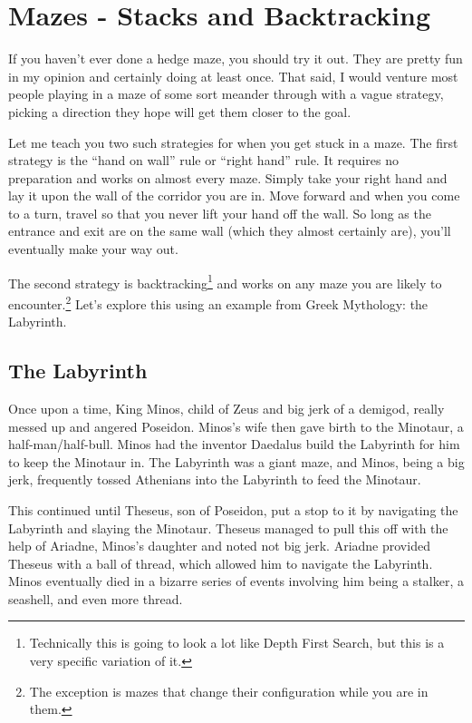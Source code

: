 \section{Mazes - Stacks and Backtracking}
\label{sec:mazes}
If you haven't ever done a hedge maze, you should try it out.  They are pretty fun in my opinion and certainly doing at least once.  That said, I would venture most people playing in a maze of some sort meander through with a vague strategy, picking a direction they hope will get them closer to the goal.

Let me teach you two such strategies for when you get stuck in a maze.  The first strategy is the ``hand on wall'' rule or ``right hand'' rule.  It requires no preparation and works on almost every maze.  Simply take your right hand and lay it upon the wall of the corridor you are in.  Move forward and when you come to a turn, travel so that you never lift your hand off the wall.  So long as the entrance and exit are on the same wall (which they almost certainly are), you'll eventually make your way out.

The second strategy is backtracking\footnote{Technically this is going to look a lot like Depth First Search, but this is a very specific variation of it.} and works on any maze you are likely to encounter.\footnote{The exception is mazes that change their configuration while you are in them.}  Let's explore this using an example from Greek Mythology: the Labyrinth. 

\subsection{The Labyrinth}
Once upon a time, King Minos, child of Zeus and big jerk of a demigod, really messed up and angered Poseidon.  Minos's wife then gave birth to the Minotaur, a half-man/half-bull.  Minos had the inventor Daedalus build the Labyrinth for him to keep the Minotaur in.  The Labyrinth was a giant maze, and Minos, being a big jerk, frequently tossed Athenians into the Labyrinth to feed the Minotaur.  

This continued until Theseus, son of Poseidon, put a stop to it by navigating the Labyrinth and slaying the Minotaur. Theseus managed to pull this off with the help of Ariadne, Minos's daughter and noted not big jerk. Ariadne provided Theseus with a ball of thread, which allowed him to navigate the Labyrinth. Minos eventually died in a bizarre series of events involving him being a stalker, a seashell, and even more thread.

